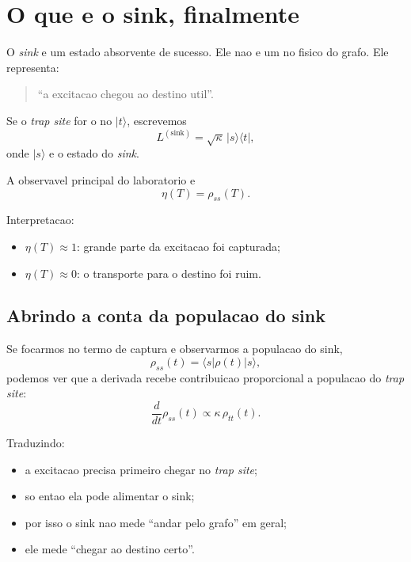\documentclass[11pt,a4paper]{article}
\begin{document}
\section{O que e o sink, finalmente}

O \emph{sink} e um estado absorvente de sucesso. Ele nao e um no fisico do
grafo. Ele representa:
\begin{quote}
``a excitacao chegou ao destino util''.
\end{quote}

Se o \emph{trap site} for o no $|t\rangle$, escrevemos
\begin{equation}
L^{(\mathrm{sink})} = \sqrt{\kappa}\,|s\rangle\langle t|,
\end{equation}
onde $|s\rangle$ e o estado do \emph{sink}.

A observavel principal do laboratorio e
\begin{equation}
\eta(T)=\rho_{ss}(T).
\end{equation}

Interpretacao:
\begin{itemize}
  \item $\eta(T)\approx 1$: grande parte da excitacao foi capturada;
  \item $\eta(T)\approx 0$: o transporte para o destino foi ruim.
\end{itemize}

\subsection{Abrindo a conta da populacao do sink}

Se focarmos no termo de captura e observarmos a populacao do sink,
\begin{equation}
\rho_{ss}(t) = \langle s|\rho(t)|s\rangle,
\end{equation}
podemos ver que a derivada recebe contribuicao proporcional a populacao do
\emph{trap site}:
\begin{equation}
\frac{d}{dt}\rho_{ss}(t) \propto \kappa\,\rho_{tt}(t).
\end{equation}

Traduzindo:
\begin{itemize}
  \item a excitacao precisa primeiro chegar no \emph{trap site};
  \item so entao ela pode alimentar o sink;
  \item por isso o sink nao mede ``andar pelo grafo'' em geral;
  \item ele mede ``chegar ao destino certo''.
\end{itemize}
\end{document}
